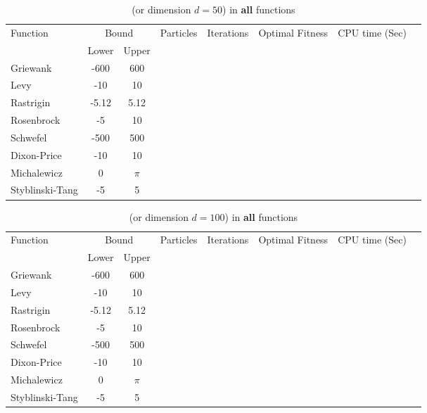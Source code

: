 \documentclass[12pt]{article}
\begin{document}
	
	\begin{table}[H]
		\caption{ (or dimension $d=50$) in \textbf{all} functions}
		\label{table:1}
		\centering
		\begin{tabular}{l c c c c c c c}
			\hline
			Function &  \multicolumn{2}{c}{Bound} & Particles & Iterations &  Optimal Fitness & CPU time (Sec) \\
			& Lower& Upper&&&\\
			\hline
			Griewank  		&  -600   & 600 	& & & & &\\
			Levy 	  		&  -10    & 10 		& & & & &\\
			Rastrigin 		&  -5.12  & 5.12 	& & & & &\\
			Rosenbrock		&  -5     & 10 		& & & & &\\
			Schwefel 	 	&  -500   & 500 	& & & & &\\
			Dixon-Price 	&   -10	  & 10 		& & & & &\\
			Michalewicz 	&   0 	  & $\pi$ 	& & & & &\\
			Styblinski-Tang & -5 	  & 5  		& & & & &\\
			\hline
		\end{tabular}
	\end{table}
	
	\begin{table}[H]
		\caption{ (or dimension $d=100$) in \textbf{all} functions}
		\label{table:1}
		\centering
		\begin{tabular}{l c c c c c c c}
			\hline
			Function &  \multicolumn{2}{c}{Bound} & Particles & Iterations &  Optimal Fitness & CPU time (Sec) \\
			& Lower& Upper&&&\\
			\hline
			Griewank  		&  -600   & 600 	& & & & &\\
			Levy 	  		&  -10    & 10 		& & & & &\\
			Rastrigin 		&  -5.12  & 5.12 	& & & & &\\
			Rosenbrock		&  -5     & 10 		& & & & &\\
			Schwefel 	 	&  -500   & 500 	& & & & &\\
			Dixon-Price 	&   -10	  & 10 		& & & & &\\
			Michalewicz 	&   0 	  & $\pi$ 	& & & & &\\
			Styblinski-Tang & -5 	  & 5  		& & & & &\\
			\hline
		\end{tabular}
	\end{table}
	
\end{document}
